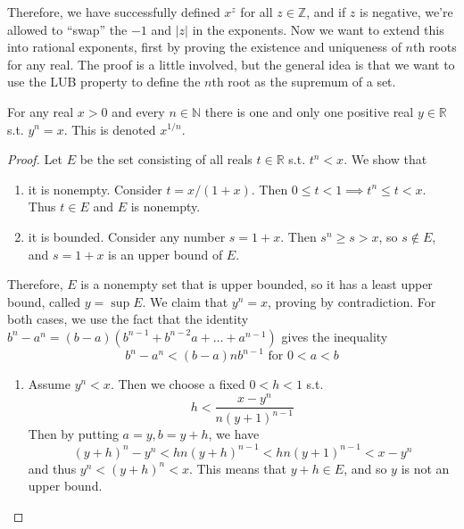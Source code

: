   Therefore, we have successfully defined $x^z$ for all $z \in \mathbb{Z}$, and if $z$ is negative, we're allowed to ``swap'' the $-1$ and $|z|$ in the exponents. Now we want to extend this into rational exponents, first by proving the existence and uniqueness of $n$th roots for any real. The proof is a little involved, but the general idea is that we want to use the LUB property to define the $n$th root as the supremum of a set.  

  \begin{theorem}
    \label{thm:existence-of-nth-roots}
    For any real $x > 0$ and every $n \in \mathbb{N}$ there is one and only one positive real $y \in \mathbb{R}$ s.t. $y^n = x$. This is denoted $x^{1/n}$. 
  \end{theorem}
  \begin{proof}
    Let $E$ be the set consisting of all reals $t \in \mathbb{R}$ s.t. $t^n < x$. We show that 
    \begin{enumerate}
      \item it is nonempty. Consider $t = x/(1+x)$. Then $0 \leq t < 1 \implies t^n \leq t < x$. Thus $t \in E$ and $E$ is nonempty. 
      \item it is bounded. Consider any number $s = 1 + x$. Then $s^n \geq s > x$, so $s \not\in E$, and $s = 1 + x$ is an upper bound of $E$. 
    \end{enumerate}
    Therefore, $E$ is a nonempty set that is upper bounded, so it has a least upper bound, called $y = \sup{E}$. We claim that $y^n = x$, proving by contradiction. For both cases, we use the fact that the identity $b^n - a^n = (b - a) (b^{n-1} + b^{n-2} a + \ldots + a^{n-1})$ gives the inequality 
    \begin{equation}
      b^n - a^n < (b-a) n b^{n-1} \text{ for } 0 < a < b
    \end{equation}
    \begin{enumerate}
      \item Assume $y^n < x$. Then we choose a fixed $0 < h < 1$ s.t. 
      \begin{equation}
        h < \frac{x - y^n}{n(y + 1)^{n-1}}
      \end{equation}
      Then by putting $a = y, b = y + h$, we have 
      \begin{equation}
        (y + h)^n - y^n < hn (y + h)^{n-1} < hn (y + 1)^{n-1} < x - y^n 
      \end{equation}
      and thus $y^n < (y + h)^n < x$. This means that $y + h \in E$, and so $y$ is not an upper bound. 


\end{enumerate}
\end{proof}
